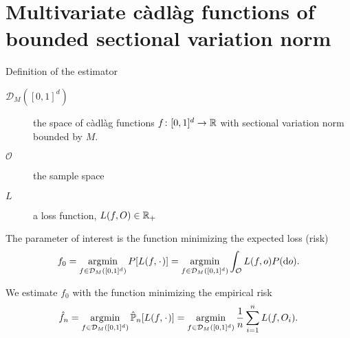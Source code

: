 \documentclass[smaller]{beamer}\usepackage{listings}
\begin{document}
\section{Multivariate càdlàg functions of bounded sectional variation norm}
\label{sec:org0cff20b}
\begin{frame}[label={sec:org057a68c}]{Definition of the estimator}
\small

\begin{description}
\item[{\(\mathcal{D}_M([0,1]^d)\)}] the space of \color{blue}càdlàg \color{black}
functions \(f \colon [0,1]^d \rightarrow \mathbb{R}\) with \color{blue}sectional
variation norm \color{black} bounded by \(M\).
\item[{\(\mathcal{O}\)}] the sample space
\item[{\(L\)}] a loss function, \(L(f, O) \in \mathbb{R}_+\)
\end{description}

\vfill 

The parameter of interest is the function minimizing the expected loss (risk)
\begin{equation*}
  f_0 = \argmin_{f\in \mathcal{D}_M([0,1]^d)} P[L(f, \blank)]
  = \argmin_{f\in \mathcal{D}_M([0,1]^d)} \int_{\mathcal{O}} L(f, o)  P (\diff o).
\end{equation*}

\vfill 

We estimate \(f_0\) with the function minimizing the empirical risk
\begin{equation*}
  \hat{f}_n
  = \argmin_{f\in \mathcal{D}_M([0,1]^d)} \empmeas[L(f, \blank)]
  = \argmin_{f\in \mathcal{D}_M([0,1]^d)} \frac{1}{n}\sum_{i=1}^{n}L(f,O_i).
\end{equation*}
\end{frame}
\end{document}
